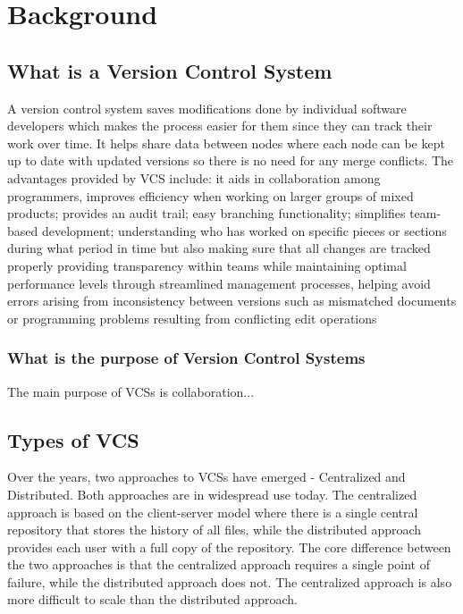 \chapter{Background}
\section{What is a Version Control System}
A version control system saves modifications done by individual software developers which makes the process easier for them since they can track their work over time. It helps share data between nodes where each node can be kept up to date with updated versions so there is no need for any merge conflicts. The advantages provided by VCS include: it aids in collaboration among programmers, improves efficiency when working on larger groups of mixed products; provides an audit trail; easy branching functionality; simplifies team-based development; understanding who has worked on specific pieces or sections during what period in time but also making sure that all changes are tracked properly providing transparency within teams while maintaining optimal performance levels through streamlined management processes, helping avoid errors arising from inconsistency between versions such as mismatched documents or programming problems resulting from conflicting edit operations
\subsection{What is the purpose of Version Control Systems}
The main purpose of VCSs is collaboration...
\section{Types of VCS}
Over the years, two approaches to VCSs have emerged - Centralized and Distributed. Both approaches are in widespread use today. The centralized approach is based on the client-server model where there is a single central repository that stores the history of all files, while the distributed approach provides each user with a full copy of the repository.
The core difference between the two approaches is that the centralized approach requires a single point of failure, while the distributed approach does not. The centralized approach is also more difficult to scale than the distributed approach.
